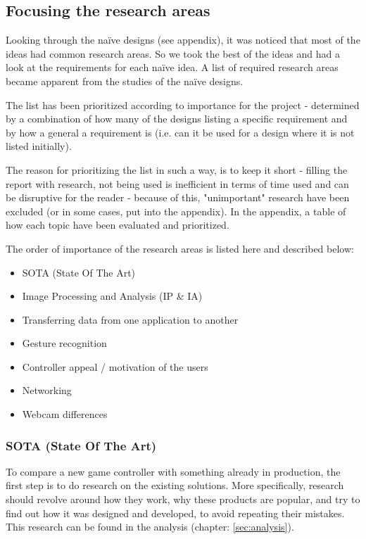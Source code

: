 \subsection{Focusing the research areas}
Looking through the naïve designs (see appendix), it was noticed that most of the ideas had common research areas. So we took the best of the ideas and had a look at the requirements for each naïve idea. A list of required research areas became apparent from the studies of the naïve designs.

The list has been prioritized according to importance for the project - determined by a combination of how many of the designs listing a specific requirement and by how a general a requirement is (i.e. can it be used for a design where it is not listed initially).

The reason for prioritizing the list in such a way, is to keep it short - filling the report with research, not being used is inefficient in terms of time used and can be disruptive for the reader - because of this, "unimportant" research have been excluded (or in some cases, put into the appendix).
In the appendix, a table of how each topic have been evaluated and prioritized.
\bigskip

The order of importance of the research areas is listed here and described below:
\begin{itemize}
\item SOTA (State Of The Art)
\item Image Processing and Analysis (IP \& IA)
\item Transferring data from one application to another
\item Gesture recognition
\item Controller appeal / motivation of the users
\item Networking
\item Webcam differences
\end{itemize}

\subsubsection{SOTA (State Of The Art)}
To compare a new game controller with something already in production, the first step is to do research on the existing solutions. More specifically, research should revolve around how they work, why these products are popular, and try to find out how it was designed and developed, to avoid repeating their mistakes. This research can be found in the analysis (chapter: \ref{sec:analysis}).


